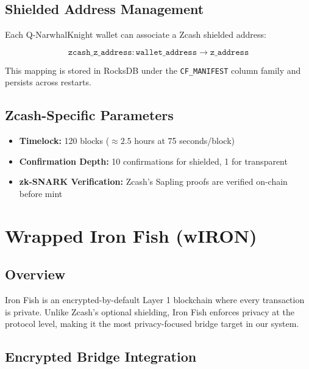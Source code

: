 \documentclass[11pt,a4paper]{article}
\begin{document}
\subsection{Shielded Address Management}

Each Q-NarwhalKnight wallet can associate a Zcash shielded address:

\begin{equation}
    \texttt{zcash\_z\_address}: \texttt{wallet\_address} \longrightarrow \texttt{z\_address}
\end{equation}

This mapping is stored in RocksDB under the \texttt{CF\_MANIFEST} column family and persists across restarts.

\subsection{Zcash-Specific Parameters}

\begin{itemize}
    \item \textbf{Timelock:} 120 blocks ($\approx 2.5$ hours at 75 seconds/block)
    \item \textbf{Confirmation Depth:} 10 confirmations for shielded, 1 for transparent
    \item \textbf{zk-SNARK Verification:} Zcash's Sapling proofs are verified on-chain before mint
\end{itemize}

\section{Wrapped Iron Fish (wIRON)}
\label{sec:wiron}

\subsection{Overview}

Iron Fish is an encrypted-by-default Layer 1 blockchain where every transaction is private. Unlike Zcash's optional shielding, Iron Fish enforces privacy at the protocol level, making it the most privacy-focused bridge target in our system.

\subsection{Encrypted Bridge Integration}
\end{document}
